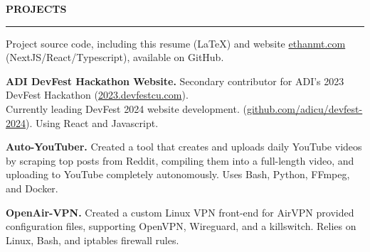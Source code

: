 \documentclass[11pt,letterpaper]{article}
\begin{document}

\medskip
\MakeUppercase{{\bf Projects}}
\medskip
\hrule
\begin{list}{}{\setlength{\leftmargin}{0em}}
    \item
          \vspace{-1.25em}
    \item {Project source code, including this resume (LaTeX) and website \href{https://www.ethanmt.com/}{ethanmt.com} (NextJS/React/Typescript), available on GitHub.}

    \item \textbf{ADI DevFest Hackathon Website.} {Secondary contributor for ADI's 2023
              DevFest Hackathon (\href{https://2023.devfestcu.com/}{2023.devfestcu.com}).
              \\ Currently leading DevFest 2024 website development.
              (\href{https://github.com/adicu/devfest-2024}{github.com/adicu/devfest-2024})}. Using React and Javascript.

    \item \textbf{Auto-YouTuber.} {Created a tool that creates and uploads daily YouTube videos by scraping top posts from Reddit, compiling them into a full-length video, and uploading to YouTube completely autonomously. Uses Bash, Python, FFmpeg, and Docker. }

    \item \textbf{OpenAir-VPN.} {Created a custom Linux VPN front-end for AirVPN provided configuration files, supporting OpenVPN, Wireguard, and a killswitch. Relies on Linux, Bash, and iptables firewall rules. }

\end{list}


\end{document}
